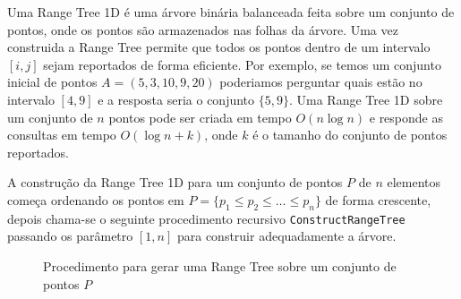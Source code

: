 \documentclass[dissertacao, brazil]{ThesisPUC}
\begin{document}
Uma Range Tree 1D é uma árvore binária balanceada feita sobre um conjunto
de pontos, onde os pontos são armazenados nas folhas da árvore. Uma vez
construida a Range Tree permite que todos os pontos dentro de um intervalo $[i, j]$
sejam reportados de forma eficiente.  Por exemplo, se temos um conjunto inicial
de pontos $A = (5, 3, 10, 9, 20)$ poderiamos perguntar quais estão no intervalo
$[4, 9]$ e a resposta seria o conjunto $\{5, 9\}$. Uma Range Tree 1D sobre um conjunto
de $n$ pontos pode ser criada em tempo $O(n\log n)$ e responde as consultas em tempo
$O(\log n + k)$, onde $k$ é o tamanho do conjunto de pontos reportados.

A construção da Range Tree 1D para um conjunto de pontos $P$ de $n$ elementos começa
ordenando os pontos em $P = \{p_1 \le p_2 \le \ldots \le p_n \}$ de forma crescente,
depois chama-se o seguinte procedimento recursivo {\tt ConstructRangeTree} passando os parâmetro $[1, n]$
para construir adequadamente a árvore.


\begin{figure}
\label{constructRangeTree}
\caption{Procedimento para gerar uma Range Tree sobre um conjunto de pontos $P$}
\end{figure}
\end{document}
